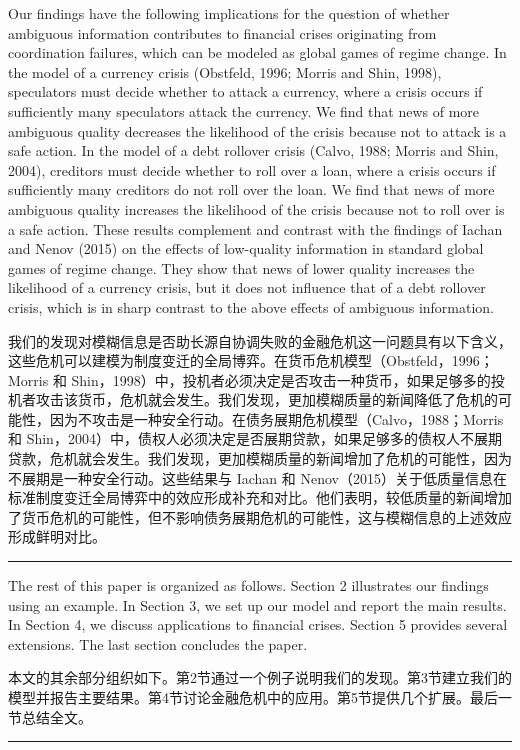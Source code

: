 \documentclass[12pt,a4paper]{article}
\newenvironment{original}
  {\par\medskip\noindent\color{black}\ignorespaces}
  {\par\medskip}
\newenvironment{translation}
  {\par\noindent\color{darkblue}\ignorespaces}
  {\par\medskip\noindent\hrule\par\medskip}
\theoremstyle{definition}
\theoremstyle{remark}
\begin{document}
\begin{original}
Our findings have the following implications for the question of whether ambiguous information contributes to financial crises originating from coordination failures, which can be modeled as global games of regime change. In the model of a currency crisis (Obstfeld, 1996; Morris and Shin, 1998), speculators must decide whether to attack a currency, where a crisis occurs if sufficiently many speculators attack the currency. We find that news of more ambiguous quality decreases the likelihood of the crisis because not to attack is a safe action. In the model of a debt rollover crisis (Calvo, 1988; Morris and Shin, 2004), creditors must decide whether to roll over a loan, where a crisis occurs if sufficiently many creditors do not roll over the loan. We find that news of more ambiguous quality increases the likelihood of the crisis because not to roll over is a safe action. These results complement and contrast with the findings of Iachan and Nenov (2015) on the effects of low-quality information in standard global games of regime change. They show that news of lower quality increases the likelihood of a currency crisis, but it does not influence that of a debt rollover crisis, which is in sharp contrast to the above effects of ambiguous information.
\end{original}
\begin{translation}
我们的发现对模糊信息是否助长源自协调失败的金融危机这一问题具有以下含义，这些危机可以建模为制度变迁的全局博弈。在货币危机模型（Obstfeld，1996；Morris 和 Shin，1998）中，投机者必须决定是否攻击一种货币，如果足够多的投机者攻击该货币，危机就会发生。我们发现，更加模糊质量的新闻降低了危机的可能性，因为不攻击是一种安全行动。在债务展期危机模型（Calvo，1988；Morris 和 Shin，2004）中，债权人必须决定是否展期贷款，如果足够多的债权人不展期贷款，危机就会发生。我们发现，更加模糊质量的新闻增加了危机的可能性，因为不展期是一种安全行动。这些结果与 Iachan 和 Nenov（2015）关于低质量信息在标准制度变迁全局博弈中的效应形成补充和对比。他们表明，较低质量的新闻增加了货币危机的可能性，但不影响债务展期危机的可能性，这与模糊信息的上述效应形成鲜明对比。
\end{translation}

\begin{original}
The rest of this paper is organized as follows. Section 2 illustrates our findings using an example. In Section 3, we set up our model and report the main results. In Section 4, we discuss applications to financial crises. Section 5 provides several extensions. The last section concludes the paper.
\end{original}
\begin{translation}
本文的其余部分组织如下。第2节通过一个例子说明我们的发现。第3节建立我们的模型并报告主要结果。第4节讨论金融危机中的应用。第5节提供几个扩展。最后一节总结全文。
\end{translation}
\end{document}
